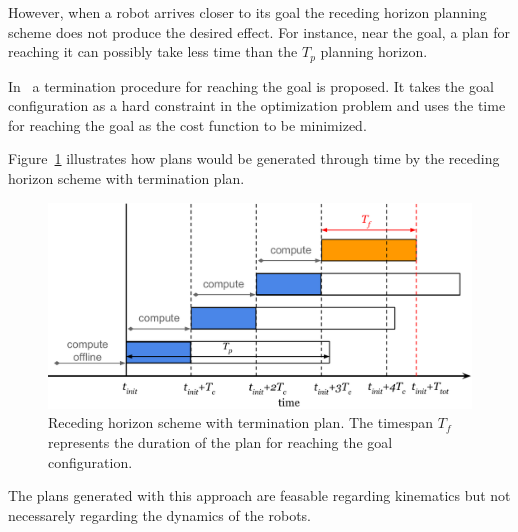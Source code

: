 \documentclass[letterpaper, 10 pt, conference]{ieeeconf}  %
\begin{document}

However, when a robot arrives closer to its goal the receding horizon planning scheme does not produce the desired effect. For instance, near the goal, a plan for reaching it can possibly take less time than the $T_p$ planning horizon. 

In~\cite{MendesFilho2015} a termination procedure for reaching the goal is proposed. It takes the goal configuration as a hard constraint in the optimization problem and uses the time for reaching the goal as the cost function to be minimized.

Figure~\ref{fig:recedinghor} illustrates how plans would be generated through time by the receding horizon scheme with termination plan.

\begin{figure}[thpb]
	\centering
	\includegraphics[width=\linewidth]{./images/MotionPlanning.pdf}
	\caption{Receding horizon scheme with termination plan. The timespan $T_f$ represents the duration of the plan for reaching the goal configuration.}
	\label{fig:recedinghor}
\end{figure}




The plans generated with this approach are feasable regarding kinematics but not necessarely regarding the dynamics of the robots.
\end{document}
